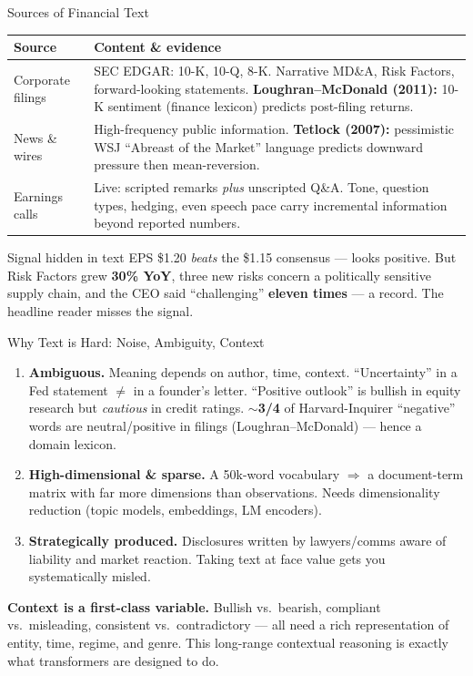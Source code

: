 \documentclass[9pt,t]{beamer}
\begin{document}
\begin{frame}{Sources of Financial Text}

\begin{tabular}{p{} p{}}
\toprule
\textbf{Source} & \textbf{Content \& evidence} \\
\midrule
Corporate filings & SEC EDGAR: 10-K, 10-Q, 8-K. Narrative MD\&A, Risk Factors,
forward-looking statements. \textbf{Loughran--McDonald (2011):} 10-K sentiment
(finance lexicon) predicts post-filing returns. \\[4pt]
News \& wires & High-frequency public information. \textbf{Tetlock (2007):}
pessimistic WSJ ``Abreast of the Market'' language predicts downward pressure
then mean-reversion. \\[4pt]
Earnings calls & Live: scripted remarks \emph{plus} unscripted Q\&A. Tone,
question types, hedging, even speech pace carry incremental information beyond
reported numbers. \\
\bottomrule
\end{tabular}

\medskip
\begin{exampleblock}{Signal hidden in text}
EPS \$1.20 \emph{beats} the \$1.15 consensus --- looks positive. But Risk Factors
grew \textbf{30\% YoY}, three new risks concern a politically sensitive supply
chain, and the CEO said ``challenging'' \textbf{eleven times} --- a record.
The headline reader misses the signal.
\end{exampleblock}
\end{frame}

\begin{frame}{Why Text is Hard: Noise, Ambiguity, Context}

\begin{enumerate}
  \item \textbf{Ambiguous.} Meaning depends on author, time, context.
        ``Uncertainty'' in a Fed statement $\neq$ in a founder's letter.
        ``Positive outlook'' is bullish in equity research but \emph{cautious} in
        credit ratings. \textbf{$\sim$3/4} of Harvard-Inquirer ``negative'' words
        are neutral/positive in filings (Loughran--McDonald) --- hence a domain lexicon.
  \item \textbf{High-dimensional \& sparse.} A 50k-word vocabulary $\Rightarrow$ a
        document-term matrix with far more dimensions than observations. Needs
        dimensionality reduction (topic models, embeddings, LM encoders).
  \item \textbf{Strategically produced.} Disclosures written by lawyers/comms
        aware of liability and market reaction. Taking text at face value gets you
        \alert{systematically misled}.
\end{enumerate}

\medskip
\begin{bigpicture}
\textbf{Context is a first-class variable.} Bullish vs.\ bearish, compliant vs.\
misleading, consistent vs.\ contradictory --- all need a rich representation of
entity, time, regime, and genre. This long-range contextual reasoning is exactly
what \alert{transformers} are designed to do.
\end{bigpicture}
\end{frame}
\end{document}
